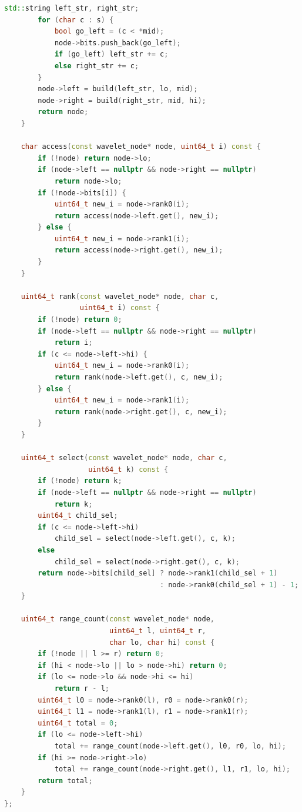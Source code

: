 \begin{lstlisting}[language=C++]
        std::string left_str, right_str;
        for (char c : s) {
            bool go_left = (c < *mid);
            node->bits.push_back(go_left);
            if (go_left) left_str += c;
            else right_str += c;
        }
        node->left = build(left_str, lo, mid);
        node->right = build(right_str, mid, hi);
        return node;
    }

    char access(const wavelet_node* node, uint64_t i) const {
        if (!node) return node->lo;
        if (node->left == nullptr && node->right == nullptr)
            return node->lo;
        if (!node->bits[i]) {
            uint64_t new_i = node->rank0(i);
            return access(node->left.get(), new_i);
        } else {
            uint64_t new_i = node->rank1(i);
            return access(node->right.get(), new_i);
        }
    }

    uint64_t rank(const wavelet_node* node, char c,
                  uint64_t i) const {
        if (!node) return 0;
        if (node->left == nullptr && node->right == nullptr)
            return i;
        if (c <= node->left->hi) {
            uint64_t new_i = node->rank0(i);
            return rank(node->left.get(), c, new_i);
        } else {
            uint64_t new_i = node->rank1(i);
            return rank(node->right.get(), c, new_i);
        }
    }

    uint64_t select(const wavelet_node* node, char c,
                    uint64_t k) const {
        if (!node) return k;
        if (node->left == nullptr && node->right == nullptr)
            return k;
        uint64_t child_sel;
        if (c <= node->left->hi)
            child_sel = select(node->left.get(), c, k);
        else
            child_sel = select(node->right.get(), c, k);
        return node->bits[child_sel] ? node->rank1(child_sel + 1)
                                     : node->rank0(child_sel + 1) - 1;
    }

    uint64_t range_count(const wavelet_node* node,
                         uint64_t l, uint64_t r,
                         char lo, char hi) const {
        if (!node || l >= r) return 0;
        if (hi < node->lo || lo > node->hi) return 0;
        if (lo <= node->lo && node->hi <= hi)
            return r - l;
        uint64_t l0 = node->rank0(l), r0 = node->rank0(r);
        uint64_t l1 = node->rank1(l), r1 = node->rank1(r);
        uint64_t total = 0;
        if (lo <= node->left->hi)
            total += range_count(node->left.get(), l0, r0, lo, hi);
        if (hi >= node->right->lo)
            total += range_count(node->right.get(), l1, r1, lo, hi);
        return total;
    }
};
\end{lstlisting}


